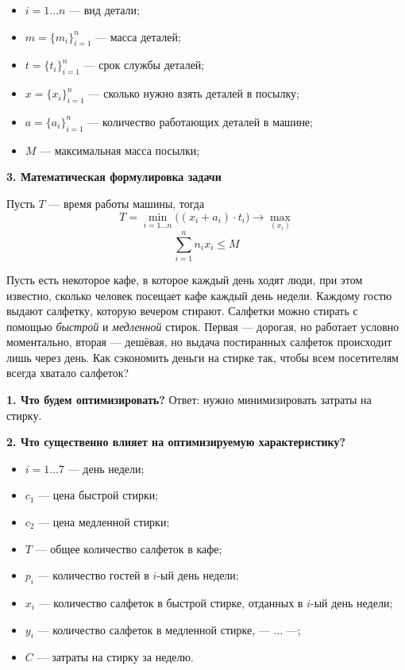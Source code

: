 \begin{itemize}
	\item $i = 1 \dots n$ --- вид детали;
	
	\item $m = \{m_i\}_{i=1}^n$ --- масса деталей;
	
	\item $t = \{t_i\}_{i=1}^n$ --- срок службы деталей;
	
	\item $x = \{x_i\}_{i=1}^n$ --- сколько нужно взять деталей в посылку;
	
	\item $a = \{a_i\}_{i=1}^n$ --- количество работающих деталей в машине;
	
	\item $M$ --- максимальная масса посылки;
\end{itemize}

\textbf{3. Математическая формулировка задачи}

Пусть $T$ --- время работы машины, тогда
\[
	T = \min_{i = 1 \dots n} \big((x_i + a_i) \cdot t_i\big) \to \max_{(x_i)}
\]
\[
	\sum_{i=1}^{n} n_i x_i \le M
\]

\problem[о салфетках]

Пусть есть некоторое кафе, в которое каждый день ходят люди, при этом известно, сколько человек посещает кафе каждый день недели. Каждому гостю выдают салфетку, которую вечером стирают. Салфетки можно стирать с помощью \textit{быстрой} и \textit{медленной} стирок. Первая --- дорогая, но работает условно моментально, вторая --- дешёвая, но выдача постиранных салфеток происходит лишь через день. Как сэкономить деньги на стирке так, чтобы всем посетителям всегда хватало салфеток?

\textbf{1. Что будем оптимизировать?} Ответ: нужно минимизировать затраты на стирку.

\textbf{2. Что существенно влияет на оптимизируемую характеристику?}

\begin{itemize}[nosep]
	\item $i = 1 \dots 7$ --- день недели;
	
	\item $c_1$ --- цена быстрой стирки;
	
	\item $c_2$ --- цена медленной стирки;
	
	\item $T$ --- общее количество салфеток в кафе;
	
	\item $p_i$ --- количество гостей в $i$-ый день недели;
	
	\item $x_i$ --- количество салфеток в быстрой стирке, отданных в $i$-ый день недели;
	
	\item $y_i$ --- количество салфеток в медленной стирке, --- $\dots$ ---;
	
	\item $C$ --- затраты на стирку за неделю.
\end{itemize}

